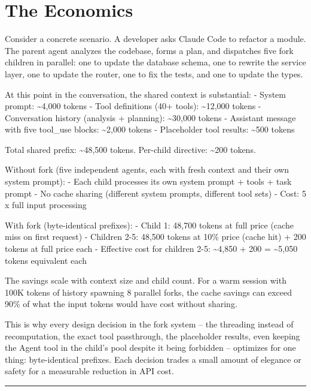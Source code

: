 \documentclass[
  english,
  11pt,
  letterpaper,
]{book}
\begin{document}
\section{The Economics}\label{the-economics}

Consider a concrete scenario. A developer asks Claude Code to refactor a
module. The parent agent analyzes the codebase, forms a plan, and
dispatches five fork children in parallel: one to update the database
schema, one to rewrite the service layer, one to update the router, one
to fix the tests, and one to update the types.

At this point in the conversation, the shared context is substantial: -
System prompt: \textasciitilde4,000 tokens - Tool definitions (40+
tools): \textasciitilde12,000 tokens - Conversation history (analysis +
planning): \textasciitilde30,000 tokens - Assistant message with five
tool\_use blocks: \textasciitilde2,000 tokens - Placeholder tool
results: \textasciitilde500 tokens

Total shared prefix: \textasciitilde48,500 tokens. Per-child directive:
\textasciitilde200 tokens.

Without fork (five independent agents, each with fresh context and their
own system prompt): - Each child processes its own system prompt + tools
+ task prompt - No cache sharing (different system prompts, different
tool sets) - Cost: 5 x full input processing

With fork (byte-identical prefixes): - Child 1: 48,700 tokens at full
price (cache miss on first request) - Children 2-5: 48,500 tokens at
10\% price (cache hit) + 200 tokens at full price each - Effective cost
for children 2-5: \textasciitilde4,850 + 200 = \textasciitilde5,050
tokens equivalent each

The savings scale with context size and child count. For a warm session
with 100K tokens of history spawning 8 parallel forks, the cache savings
can exceed 90\% of what the input tokens would have cost without
sharing.

This is why every design decision in the fork system -- the threading
instead of recomputation, the exact tool passthrough, the placeholder
results, even keeping the Agent tool in the child's pool despite it
being forbidden -- optimizes for one thing: byte-identical prefixes.
Each decision trades a small amount of elegance or safety for a
measurable reduction in API cost.

\begin{center}\rule{0.5\linewidth}{0.5pt}\end{center}
\end{document}
